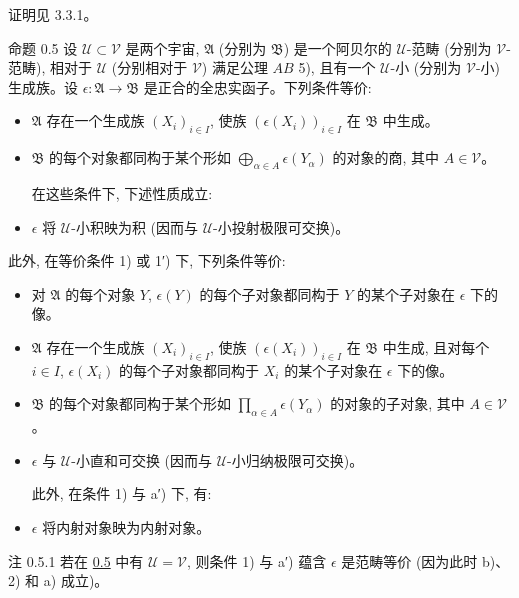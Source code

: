 证明\sisi{}{,}见 \cite{sga4.exp.V.bib.11} 3.3.1。

\begin{enonce*}{命题 0.5}
设 $𝒰 \subset 𝒱$ 是两个宇宙, $\mathfrak{A}$ (分别为 $\mathfrak{B}$) 是一个阿贝尔的 $𝒰$-范畴 (分别为 $𝒱$-范畴), 相对于 $𝒰$ (分别相对于 $𝒱$) 满足公理 $AB$ 5), 且有一个 $𝒰$-小 (分别为 $𝒱$-小) 生成族。设 $\epsilon : \mathfrak{A} \to \mathfrak{B}$ 是正合的全忠实函子。下列条件等价:
\begin{itemize}
\item[1)] $\mathfrak{A}$ 存在一个生成族 $(X_i)_{i\in I}$, 使族 $(\epsilon(X_i))_{i\in I}$ 在 $\mathfrak{B}$ 中生成。

\item[1′)] $\mathfrak{B}$ 的每个对象都同构于某个形如 $\displaystyle{⨁_{\alpha \in A}} \epsilon (Y_\alpha)$ 的对象的商, 其中 $A \in 𝒱$。

在这些条件下, 下述性质成立:

\item[2)] $\epsilon$ 将 $𝒰$-小积映为积 (因而与 $𝒰$-小投射极限可交换)。
\end{itemize}

此外, 在等价条件 1) 或 1′) 下, 下列条件等价\pageoriginale:
\begin{itemize}
\item[a)] 对 $\mathfrak{A}$ 的每个对象 $Y$, $\epsilon(Y)$ 的每个子对象都同构于 $Y$ 的某个子对象在 $\epsilon$ 下的像。

\item[a′)] $\mathfrak{A}$ 存在一个生成族 $(X_i)_{i \in I}$, 使族 $(\epsilon(X_i))_{i \in I}$ 在 $\mathfrak{B}$ 中生成, 且对每个 $i \in
  I$, $\epsilon(X_i)$ 的每个子对象都同构于 $X_i$ 的某个子对象在 $\epsilon$ 下的像。

\item[b)] $\mathfrak{B}$ 的每个对象都同构于某个形如 $\prod_{\alpha \in A} \epsilon(Y_\alpha)$ 的对象的子对象, 其中 $A \in 𝒱$。

\item[c)] $\epsilon$ 与 $𝒰$-小直和可交换 (因而与 $𝒰$-小归纳极限可交换)。

此外, 在条件 1) 与 a′) 下, 有:

\item[d)] $\epsilon$ 将内射对象映为内射对象。
\end{itemize}
\end{enonce*}

\begin{enonce*}[remark]{注 0.5.1}
若在 \hyperref[V.prop0.5]{0.5} 中有 $𝒰 = 𝒱$, 则条件 1) 与 a′) 蕴含 $\epsilon$ 是范畴等价 (因为此时 b)、2) 和 a) 成立)。
\end{enonce*}


